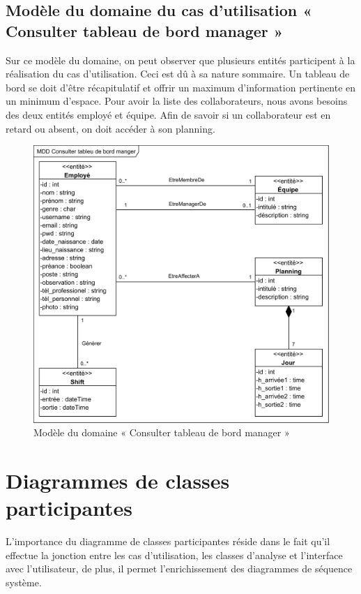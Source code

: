         \subsection*{Modèle du domaine du cas d'utilisation « Consulter tableau de bord manager »}
        Sur ce modèle du domaine, on peut observer que plusieurs entités participent à la réalisation du cas d’utilisation. Ceci est dû à sa nature sommaire.
        Un tableau de bord se doit d’être récapitulatif et offrir un maximum d’information pertinente en un minimum d’espace. Pour avoir la liste des collaborateurs, nous avons besoins des deux entités employé et équipe. Afin de savoir si un collaborateur est en retard ou absent, on doit accéder à son planning. 
        
            \begin{figure}[h!]
                 \centering
                \includegraphics[scale=1.06]{images/MDD/MDD Consulter tableu de bord manger.png}
                 \caption{Modèle du domaine « Consulter tableau de bord manager »}
                 \label{fig19}
            \end{figure}
            
\section{Diagrammes de classes participantes}
    L’importance du diagramme de classes participantes réside dans le fait qu’il effectue la jonction entre les cas d’utilisation, les classes d’analyse et l’interface avec l’utilisateur, de plus, il permet l’enrichissement des diagrammes de séquence système.\cite{8}
